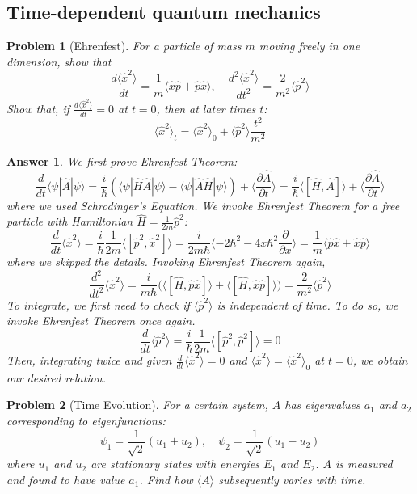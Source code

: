 \documentclass[a4paper]{article}
\newtheorem{ans}{Answer}[section]
\theoremstyle{new}
\newtheorem{qns}{Problem}[section]
\begin{document}
\subsection*{Time-dependent quantum mechanics}
\begin{qns}[Ehrenfest]
For a particle of mass $m$ moving freely in one dimension, show that
$$\frac{d\langle \hat{x}^2\rangle}{dt}=\frac{1}{m}\langle\hat{x}\hat{p}+\hat{p}\hat{x}\rangle,\quad\frac{d^2\langle \hat{x}^2\rangle}{dt^2}=\frac{2}{m^2}\langle\hat{p}^2\rangle$$
Show that, if $\frac{d\langle\hat{x}^2\rangle}{dt}=0$ at $t=0$, then at later times $t$:
$$\langle\hat{x}^2\rangle_t=\langle\hat{x}^2\rangle_0+\langle\hat{p}^2\rangle\frac{t^2}{m^2}$$
\end{qns}
\newpage
\begin{ans}
We first prove Ehrenfest Theorem:
$$\frac{d}{dt}\langle\psi|\hat{A}|\psi\rangle=\frac{i}{\hbar}(\langle\psi|\hat{H}\hat{A}|\psi\rangle-\langle\psi|\hat{A}\hat{H}|\psi\rangle)+\langle\frac{\partial\hat{A}}{\partial t}\rangle=\frac{i}{\hbar}\langle[\hat{H},\hat{A}]\rangle+\langle\frac{\partial\hat{A}}{\partial t}\rangle$$
where we used Schrodinger's Equation. We invoke Ehrenfest Theorem for a free particle with Hamiltonian $\hat{H}=\frac{1}{2m}\hat{p}^2$:
$$\frac{d}{dt}\langle\hat{x}^2\rangle=\frac{i}{\hbar}\frac{1}{2m}\langle[\hat{p}^2,\hat{x}^2]\rangle=\frac{i}{2m\hbar}\langle-2\hbar^2-4x\hbar^2\frac{\partial}{\partial x}\rangle=\frac{1}{m}\langle\hat{p}\hat{x}+\hat{x}\hat{p}\rangle$$
where we skipped the details. Invoking Ehrenfest Theorem again,
$$\frac{d^2}{dt^2}\langle\hat{x}^2\rangle=\frac{i}{m\hbar}\bigg(\langle[\hat{H},\hat{p}\hat{x}]\rangle+\langle[\hat{H},\hat{x}\hat{p}]\rangle\bigg)=\frac{2}{m^2}\langle\hat{p}^2\rangle$$
To integrate, we first need to check if $\langle\hat{p}^2\rangle$ is independent of time. To do so, we invoke Ehrenfest Theorem once again.
$$\frac{d}{dt}\langle\hat{p}^2\rangle=\frac{i}{\hbar}\frac{1}{2m}\langle[\hat{p}^2,\hat{p}^2]\rangle=0$$
Then, integrating twice and given $\frac{d}{dt}\langle\hat{x}^2\rangle=0$ and $\langle\hat{x}^2\rangle=\langle\hat{x}^2\rangle_0$ at $t=0$, we obtain our desired relation.
\end{ans}
\begin{qns}[Time Evolution]
For a certain system, $A$ has eigenvalues $a_1$ and $a_2$ corresponding to eigenfunctions:
$$\psi_1=\frac{1}{\sqrt{2}}(u_1+u_2),\quad\psi_2=\frac{1}{\sqrt{2}}(u_1-u_2)$$
where $u_1$ and $u_2$ are stationary states with energies $E_1$ and $E_2$. $A$ is measured and found to have value $a_1$. Find how $\langle A\rangle$ subsequently varies with time.
\end{qns}
\end{document}
